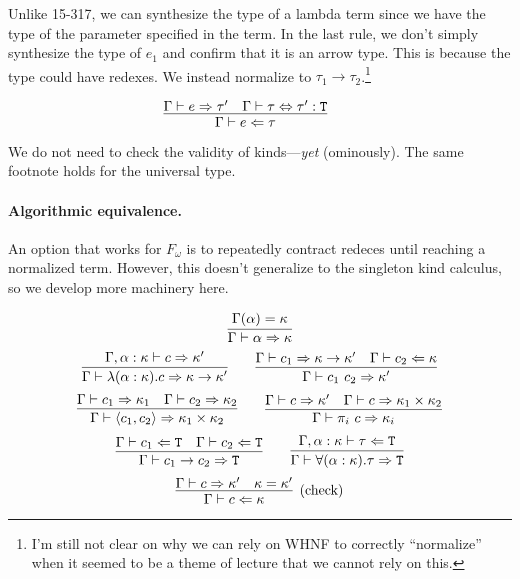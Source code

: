 Unlike 15-317, we can synthesize the type of a lambda term since we have the type
of the parameter specified in the term.
In the last rule, we don't simply synthesize the type of $e_1$ and confirm that it
is an arrow type.  This is because the type could have redexes. We instead normalize
to $\tau_1 \rightarrow \tau_2$.\footnote{I'm still not clear on why we can rely on WHNF
to correctly ``normalize'' when it seemed to be a theme of lecture that we cannot rely
on this.}

\begin{judgment}
\[
  \infer
    {\Gamma \vdash e \Leftarrow \tau}
    {\Gamma \vdash e \Rightarrow \tau'
    &\Gamma \vdash \tau \Leftrightarrow \tau' : \T
    }
  \qquad
\]
\end{judgment}

We do not need to check the validity of kinds---\emph{yet} (ominously). The same footnote
holds for the universal type.

\paragraph{Algorithmic equivalence.} An option that works for $F_\omega$ is to repeatedly
contract redeces until reaching a normalized term. However, this doesn't generalize
to the singleton kind calculus, so we develop more machinery here.

\begin{judgment}
  \[ \infer{\Gamma \vdash \alpha \Rightarrow \kappa}{\Gamma(\alpha) = \kappa} \]
  \[\infer{\Gamma \vdash \lambda (\alpha : \kappa).c \Rightarrow \kappa \rightarrow \kappa'}
         {\Gamma, \alpha : \kappa \vdash c \Rightarrow \kappa'}
   \qquad
   \infer{\Gamma \vdash c_1~c_2 \Rightarrow \kappa'}
         {\Gamma \vdash c_1 \Rightarrow \kappa \rightarrow \kappa'
         &\Gamma \vdash c_2 \Leftarrow \kappa
         }
  \]
  \[
    \infer{\Gamma \vdash \langle c_1, c_2 \rangle \Rightarrow \kappa_1 \times \kappa_2}
      {\Gamma \vdash c_1 \Rightarrow \kappa_1
      &\Gamma \vdash c_2 \Rightarrow \kappa_2
      }
    \qquad
    \infer{\Gamma \vdash \pi_i~c \Rightarrow \kappa_i}
      {\Gamma \vdash c \Rightarrow \kappa'
      &\Gamma \vdash c \Rightarrow \kappa_1 \times \kappa_2
      }
  \]
  \[
    \infer{\Gamma \vdash c_1 \rightarrow c_2 \Rightarrow \T}
      {\Gamma \vdash c_1 \Leftarrow \T
      &\Gamma \vdash c_2 \Leftarrow \T
      }
    \qquad
    \infer{\Gamma \vdash \forall(\alpha : \kappa).\tau \Rightarrow \T}
      {\Gamma, \alpha : \kappa \vdash \tau \Leftarrow \T}
  \]
  \[
    \infer[\text{(check)}]
      {\Gamma \vdash c \Leftarrow \kappa}
      {\Gamma \vdash c \Rightarrow \kappa'
      &\kappa = \kappa'
      }
  \]
\end{judgment}

